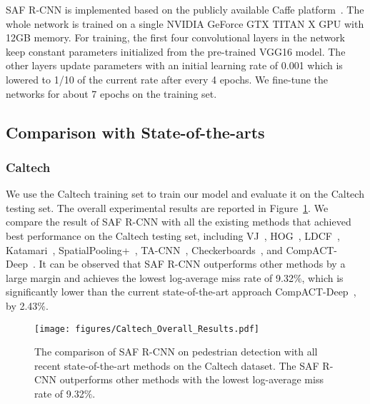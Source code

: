 \documentclass[journal]{IEEEtran}
\begin{document}
SAF R-CNN is implemented based on the publicly available Caffe platform~\cite{jia2014caffe}. The whole network is trained on a single NVIDIA GeForce GTX TITAN X GPU with 12GB memory. For training, the first four convolutional layers in the network keep constant parameters initialized from the pre-trained VGG16 model. The other layers update parameters with an initial learning rate of 0.001 which is lowered to 1/10 of the current rate after every 4 epochs. We fine-tune the networks for about 7 epochs on the training set. 

\subsection{Comparison with State-of-the-arts}
\subsubsection{Caltech}
We use the Caltech training set to train our model and evaluate it on the Caltech testing set. The overall experimental results are reported in Figure~\ref{fig:Caltech_Overall_Results}. We compare the result of SAF R-CNN
with all the existing methods that achieved best performance on the Caltech testing set, including VJ~\cite{viola2004robust}, HOG~\cite{dalal2005histograms}, LDCF~\cite{nam2014local}, Katamari~\cite{benenson2014ten}, SpatialPooling+~\cite{paisitkriangkrai2014strengthening}, TA-CNN~\cite{ta_cnn}, Checkerboards~\cite{zhang2015filtered}, and CompACT-Deep~\cite{compact}. It can be observed that SAF R-CNN outperforms other methods by a large margin and achieves the lowest log-average miss rate of 9.32$\%$, which is significantly lower than the current state-of-the-art approach CompACT-Deep~\cite{compact}, by 2.43$\%$.

\begin{figure}
	\begin{center}
		\texttt{[image: figures/Caltech\_Overall\_Results.pdf]}
		\caption{{The comparison of SAF R-CNN on pedestrian detection with all recent state-of-the-art methods on the Caltech dataset. The SAF R-CNN outperforms other methods with the lowest log-average miss rate of 9.32$\%$.}}
		\label{fig:Caltech_Overall_Results}
	\end{center}
	\vspace{-4mm}
\end{figure}
\end{document}
